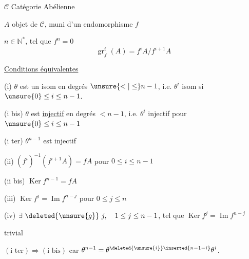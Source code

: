 $\mathcal C$ Catégorie Abélienne

$A$ objet de $\mathcal C$, muni d'un endomorphisme $f$

$n\in\mathbb N^*$, tel que $f^n=0$
\[
\operatorname{gr}_f^i(A)=f^iA/f^{i+1}A
\]

\uline{Conditions équivalentes}

(i) $\theta$ est un isom en degrés $\unsure{<|\leq}n-1$, i.e. $\theta^i$ isom si $\unsure{0}\leq i\leq n-1$.

(i bis) $\theta$ est \uline{injectif} en degrés $<n-1$, i.e. $\theta^i$ injectif pour $\unsure{0}\leq i\leq n-1$

(i ter) $\theta^{n-1}$ est injectif

(ii) $(f^i)^{-1}(f^{i+1}A)=fA$ pour $0\leq i\leq n-1$

(ii bis)  $\boxed{\operatorname{Ker}f^{n-1}=fA}$

(iii) $\operatorname{Ker}f^j=\operatorname{Im}f^{n-j}$ pour  $0\leq j\leq n$

(iv) $\exists\ \deleted{\unsure{g}}\ j,\quad1\leq j\leq n-1$, tel que $\operatorname{Ker}f^j=\operatorname{Im}f^{n-j}$

 trivial

$(\text{i ter})\Longrightarrow(\text{i bis})$ car $\theta^{n-1}=\theta^{\deleted{\unsure{i}}\inserted{n-1-i}}\theta^i$.


